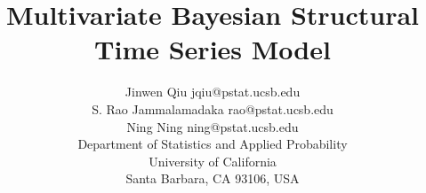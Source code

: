 \documentclass[twoside,11pt]{article}
\begin{document}
\title{Multivariate Bayesian Structural Time Series Model}

\author{\name Jinwen Qiu \email jqiu@pstat.ucsb.edu \\
       \name S. Rao Jammalamadaka \email rao@pstat.ucsb.edu \\
       \name Ning Ning \email ning@pstat.ucsb.edu \\
       \addr Department of Statistics and Applied Probability\\
       University of California\\
       Santa Barbara, CA 93106, USA}
   
\maketitle
\end{document}
